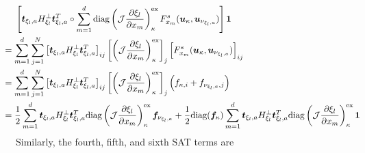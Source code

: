 \documentclass[12pt,a4paper]{article}
\newcommand{\pder}[2][]{\dfrac{\partial #1}{\partial #2}} %
\newcommand{\fn}[1]{\mathcal{#1}} %
\begin{document}
\begin{align*}
\left[ \bm{t}_{\xi_l, a} H^{\bot}_{\xi_l} \bm{t}_{\xi_l, a}^T \circ \sum_{m=1}^d \text{diag} \left( \fn{J} \pder[\xi_l]{x_m} \right)_{\kappa}^\text{ex} F^s_{x_m} (\bm{u}_\kappa, \bm{u}_{\nu_{\xi_l,a}}) \right] \bm{1} &\\
& \hspace{-9cm} =   \sum_{m=1}^d  \sum_{j=1}^N \left[ \bm{t}_{\xi_l, a} H^{\bot}_{\xi_l} \bm{t}_{\xi_l, a}^T \right]_{ij} \left[  \left( \fn{J} \pder[\xi_l]{x_m} \right)_{\kappa}^\text{ex} \right]_j \left[ F^s_{x_m} (\bm{u}_\kappa, \bm{u}_{\nu_{\xi_l,a}}) \right]_{ij} \\
& \hspace{-9cm} =  \sum_{m=1}^d  \sum_{j=1}^N \left[ \bm{t}_{\xi_l, a} H^{\bot}_{\xi_l} \bm{t}_{\xi_l, a}^T \right]_{ij} \left[  \left( \fn{J} \pder[\xi_l]{x_m} \right)_{\kappa}^\text{ex} \right]_j   \left( f_{\kappa,i} + f_{\nu_{\xi_l,a},j} \right) \\
& \hspace{-9cm} =  \frac{1}{2} \sum_{m=1}^d  \bm{t}_{\xi_l, a} H^{\bot}_{\xi_l} \bm{t}_{\xi_l, a}^T \text{diag} \left( \fn{J} \pder[\xi_l]{x_m} \right)_{\kappa}^\text{ex} \bm{f}_{\nu_{\xi_l,a}} + \frac{1}{2} \text{diag} (\bm{f}_\kappa) \sum_{m=1}^d  \bm{t}_{\xi_l, a} H^{\bot}_{\xi_l} \bm{t}_{\xi_l, a}^T \text{diag} \left( \fn{J} \pder[\xi_l]{x_m} \right)_{\kappa}^\text{ex} \bm{1} \\
\end{align*}
Similarly, the fourth, fifth, and sixth SAT terms are
\end{document}
